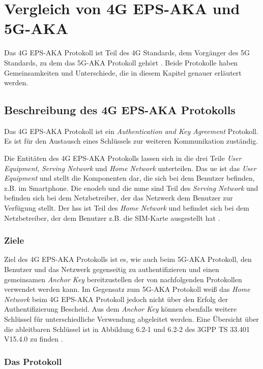 \chapter{Vergleich von 4G EPS-AKA und 5G-AKA}
\label{chap:3}

Das 4G EPS-AKA Protokoll ist Teil des 4G Standards, dem Vorgänger des 5G Standards, zu dem das 5G-AKA Protokoll gehört \cite{Compare}.
Beide Protokolle haben Gemeinsamkeiten und Unterschiede, die in diesem Kapitel genauer erläutert werden.


\section{Beschreibung des 4G EPS-AKA Protokolls}

Das 4G EPS-AKA Protokoll ist ein \textit{Authentication and Key Agreement} Protokoll.
Es ist für den Austausch eines Schlüssels zur weiteren Kommunikation zuständig.

Die Entitäten des 4G EPS-AKA Protokolls lassen sich in die drei Teile \textit{User Equipment}, \textit{Serving Network} und \textit{Home Network} unterteilen.
Das \gls{ue} ist das \textit{User Equipment} und stellt die Komponenten dar, die sich bei dem Benutzer befinden, z.B. im Smartphone.
Die \gls{enodeb} und die \gls{mme} sind Teil des \textit{Serving Network} und befinden sich bei dem Netzbetreiber, der das Netzwerk dem Benutzer zur Verfügung stellt.
Der \gls{hss} ist Teil des \textit{Home Network} und befindet sich bei dem Netzbetreiber, der dem Benutzer z.B. die SIM-Karte ausgestellt hat \cite{Compare}.

\subsection{Ziele}

Ziel des 4G EPS-AKA Protokolls ist es, wie auch beim 5G-AKA Protokoll, den Benutzer und das Netzwerk gegenseitig zu authentifizieren und einen gemeinsamen \textit{Anchor Key} bereitzustellen der von nachfolgenden Protokollen verwendet werden kann.
Im Gegensatz zum 5G-AKA Protokoll weiß das \textit{Home Network} beim 4G EPS-AKA Protokoll jedoch nicht über den Erfolg der Authentifizierung Bescheid.
Aus dem \textit{Anchor Key} können ebenfalls weitere Schlüssel für unterschiedliche Verwendung abgeleitet werden.
Eine Übersicht über die ableitbaren Schlüssel ist in Abbildung 6.2-1 und 6.2-2 des 3GPP TS 33.401 V15.4.0 zu finden \cite[33, 35]{3gppTS33.401V15.4.0}.

\subsection{Das Protokoll \cite{Compare}}

